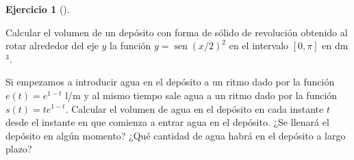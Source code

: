 \documentclass[
  a4paper,
]{scrreport}
\theoremstyle{definition}
\newtheorem{exercise}{Ejercicio}[chapter]
\theoremstyle{remark}
\begin{document}
\begin{exercise}[]\protect\hypertarget{exr-3}{}\label{exr-3}

Calcular el volumen de un depósito con forma de sólido de revolución
obtenido al rotar alrededor del eje \(y\) la función
\(y = \operatorname{sen}(x/2)^2\) en el intervalo \([0, \pi]\) en
dm\(^3\).

Si empezamos a introducir agua en el depósito a un ritmo dado por la
función \(e(t)=e^{1-t}\) l/m y al mismo tiempo sale agua a un ritmo dado
por la función \(s(t)=te^{1-t}\). Calcular el volumen de agua en el
depósito en cada instante \(t\) desde el instante en que comienza a
entrar agua en el depósito. ¿Se llenará el depósito en algún momento?
¿Qué cantidad de agua habrá en el depósito a largo plazo?

\end{exercise}
\end{document}
